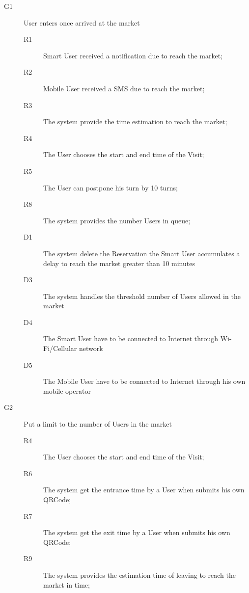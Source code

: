 \begin{description}
    \item[G1]User enters once arrived at the market
    
    \begin{description}
    \item[R1] Smart User received a notification due to reach the market;
    \item[R2] Mobile User received a SMS due to reach the market;  %
    \item[R3] The system provide the time estimation to reach the market;
    \item[R4] The User chooses the start and end time of the Visit;
    \item[R5] The User can postpone his turn by 10 turns;
    \item[R8] The system provides the number Users in queue; %
    \item[D1] The system delete the Reservation the Smart User accumulates a delay to reach the market greater than 10 minutes
    \item[D3] The system handles the threshold number of Users allowed in the market
    \item[D4] The Smart User have to be connected to Internet through Wi-Fi/Cellular network
    \item[D5] The Mobile User have to be connected to Internet through his own mobile operator
    \end{description}
    
    \item[G2]Put a limit to the number of Users in the market
    
    \begin{description}
    \item[R4] The User chooses the start and end time of the Visit;
    \item[R6] The system get the entrance time by a User when submits his own QRCode;
    \item[R7] The system get the exit time by a User when submits his own QRCode;
    \item[R9] The system provides the estimation time of leaving to reach the market in time;
    \end{description}
    

\end{description}

